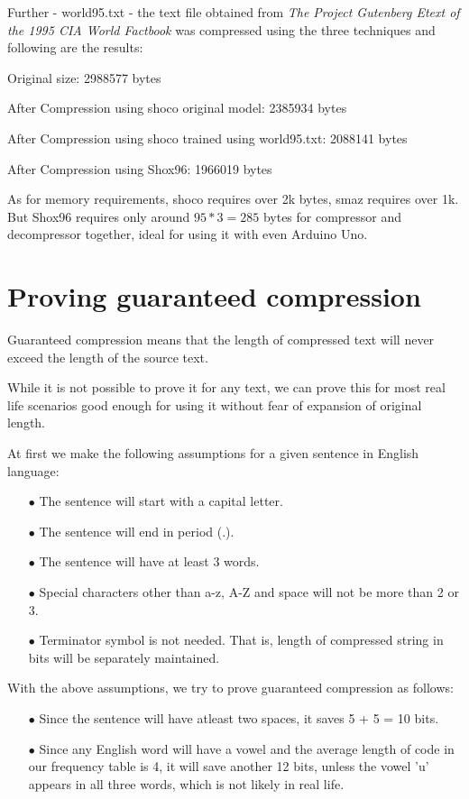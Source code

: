 \documentclass[]{article}
\begin{document}
Further - world95.txt - the text file obtained from \emph{The Project Gutenberg Etext of the 1995 CIA World Factbook} was compressed using the three techniques and following are the results:

Original size: 2988577 bytes

After Compression using shoco original model: 2385934 bytes

After Compression using shoco trained using world95.txt: 2088141 bytes

After Compression using Shox96: 1966019 bytes

As for memory requirements, shoco requires over 2k bytes, smaz requires over 1k. But Shox96 requires only around $95 * 3 = 285$ bytes for compressor and decompressor together, ideal for using it with even Arduino Uno.

\section{Proving guaranteed compression}

Guaranteed compression means that the length of compressed text will never exceed the length of the source text.

While it is not possible to prove it for any text, we can prove this for most real life scenarios good enough for using it without fear of expansion of original length.

At first we make the following assumptions for a given sentence in English language:
\begin{itemize}
	\item[$\bullet$] The sentence will start with a capital letter.
	\item[$\bullet$] The sentence will end in period (.).
	\item[$\bullet$] The sentence will have at least 3 words.
	\item[$\bullet$] Special characters other than a-z, A-Z and space will not be more than 2 or 3.
	\item[$\bullet$] Terminator symbol is not needed. That is, length of compressed string in bits will be separately maintained.
\end{itemize}

With the above assumptions, we try to prove guaranteed compression as follows:

\begin{itemize}
	\item[$\bullet$] Since the sentence will have atleast two spaces, it saves 5 + 5 = 10 bits.
	\item[$\bullet$] Since any English word will have a vowel and the average length of code in our frequency table is 4, it will save another 12 bits, unless the vowel 'u' appears in all three words, which is not likely in real life.
\end{itemize}
\end{document}
